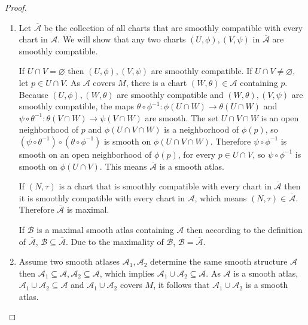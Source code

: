\begin{proof}
    \begin{enumerate}[itemsep=0pt,label={(\alph*)}]
        \item Let \( \overline{\mathcal{A}} \) be the collection of all charts that are smoothly compatible with every chart in \( \mathcal{A} \). We will show that any two charts \( (U, \phi), (V, \psi) \) in \( \overline{\mathcal{A}} \) are smoothly compatible.

              If \( U \cap V = \varnothing \) then \( (U, \phi), (V, \psi) \) are smoothly compatible. If \( U \cap V \ne \varnothing \), let \( p \in U \cap V \). As \( \mathcal{A} \) covers \( M \), there is a chart \( (W, \theta) \in \mathcal{A} \) containing \( p \). Because \( (U, \phi), (W, \theta) \) are smoothly compatible and \( (W, \theta), (V, \psi) \) are smoothly compatible, the maps \( \theta \circ \phi^{-1}: \phi(U \cap W) \to \theta(U \cap W) \) and \( \psi \circ \theta^{-1}: \theta(V \cap W) \to \psi(V \cap W) \) are smooth. The set \( U \cap V \cap W \) is an open neighborhood of \( p \) and \( \phi(U \cap V \cap W) \) is a neighborhood of \( \phi(p) \), so \( (\psi \circ \theta^{-1}) \circ (\theta \circ \phi^{-1}) \) is smooth on \( \phi(U \cap V \cap W) \). Therefore \( \psi \circ \phi^{-1} \) is smooth on an open neighborhood of \( \phi(p) \), for every \( p \in U \cap V \), so \( \psi \circ \phi^{-1} \) is smooth on \( \phi(U \cap V) \). This means \( \overline{\mathcal{A}} \) is a smooth atlas.

              If \( (N, \tau) \) is a chart that is smoothly compatible with every chart in \( \overline{\mathcal{A}} \) then it is smoothly compatible with every chart in \( \mathcal{A} \), which means \( (N, \tau) \in \overline{\mathcal{A}} \). Therefore \( \overline{\mathcal{A}} \) is maximal.

              If \( \mathcal{B} \) is a maximal smooth atlas containing \( \mathcal{A} \) then according to the definition of \( \overline{\mathcal{A}} \), \( \mathcal{B} \subseteq \overline{\mathcal{A}} \). Due to the maximality of \( \mathcal{B} \), \( \mathcal{B} = \overline{\mathcal{A}} \).
        \item Assume two smooth atlases \( \mathcal{A}_{1}, \mathcal{A}_{2} \) determine the same smooth structure \( \mathcal{A} \) then \( \mathcal{A}_{1} \subseteq \mathcal{A}, \mathcal{A}_{2} \subseteq \mathcal{A} \), which implies \( \mathcal{A}_{1} \cup \mathcal{A}_{2} \subseteq \mathcal{A} \). As \( \mathcal{A} \) is a smooth atlas, \( \mathcal{A}_{1} \cup \mathcal{A}_{2} \subseteq \mathcal{A} \) and \( \mathcal{A}_{1} \cup \mathcal{A}_{2} \) covers \( M \), it follows that \( \mathcal{A}_{1} \cup \mathcal{A}_{2} \) is a smooth atlas.
    \end{enumerate}
\end{proof}


